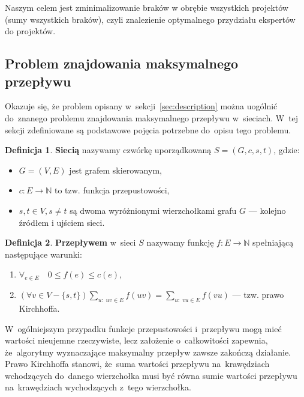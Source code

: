 \documentclass[12pt,a4paper]{article}
\theoremstyle{definition}
\newtheorem{defn}{Definicja}
\begin{document}
\vspace{0.5em}
\noindent
Naszym celem jest zminimalizowanie braków w obrębie wszystkich projektów (sumy wszystkich braków), czyli znalezienie optymalnego przydziału ekspertów do projektów.

\subsection{Problem znajdowania maksymalnego przepływu}
\label{sec:maxflow}
Okazuje się, że problem opisany w~sekcji~\ref{sec:description} można uogólnić
do~znanego problemu znajdowania maksymalnego przepływu w~sieciach. W~tej sekcji
zdefiniowane są podstawowe pojęcia potrzebne do~opisu tego problemu.

\begin{defn}
\textbf{Siecią} nazywamy czwórkę uporządkowaną $S = (G,c,s,t)$, gdzie:
\begin{itemize}
	\item $G = (V,E)$ jest grafem skierowanym,
	\item $c : E \to \mathbb{N}$ to tzw. funkcja przepustowości,
	\item $s,t \in V, s \neq t$ są dwoma wyróżnionymi wierzchołkami grafu $G$
	--- kolejno źródłem i ujściem sieci.
\end{itemize}
\end{defn}

\begin{defn}
\textbf{Przepływem} w~sieci $S$ nazywamy funkcję $f : E \to \mathbb{N}$
spełniającą następujące warunki:
\begin{enumerate}
	\item $\forall_{e \in E} \quad 0 \leqslant f(e) \leqslant c(e)$,
	\item $\displaystyle(\forall v \in V - \{ s,t \})
	\sum_{u : \; uv \in E} f(uv) = \sum_{u : \; vu \in E} f(vu)$ 
	--- tzw. prawo Kirchhoffa.
\end{enumerate}
\end{defn}

\noindent
W~ogólniejszym przypadku funkcje przepustowości i~przepływu mogą mieć wartości
nieujemne rzeczywiste, lecz założenie o~całkowitości zapewnia, że~algorytmy
wyznaczające maksymalny przepływ zawsze zakończą działanie.\\

\noindent
Prawo Kirchhoffa stanowi, że~suma wartości przepływu na~krawędziach wchodzących
do~danego wierzchołka musi być równa sumie wartości przepływu na~krawędziach
wychodzących z~tego wierzchołka.
\end{document}
